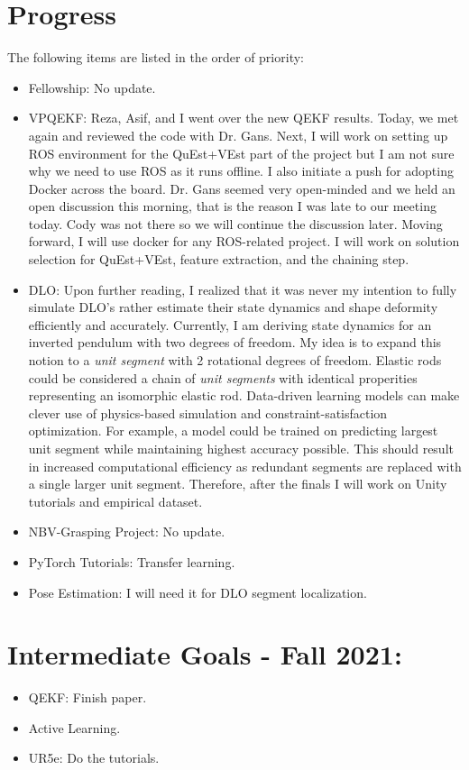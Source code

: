 \documentclass[11pt]{article}
\begin{document}
\section{Progress}
The following items are listed in the order of priority:
\begin{itemize}
      \item Fellowship: No update.
      \item VPQEKF: Reza, Asif, and I went over the new QEKF results. Today, we met
      again and reviewed the code with Dr. Gans. Next, I will work on setting
      up ROS environment
      for the QuEst+VEst \cite{QuEst} part of the project but I am not sure why we need to
      use ROS as it runs offline. I also initiate a push for adopting Docker
      across the board. Dr.
      Gans seemed very open-minded and we held an open discussion this morning,
      that is the reason I was late to our meeting today. Cody was not there so
      we will continue the discussion later. Moving forward, I will use docker
      for any ROS-related project. I will work on solution selection for QuEst+VEst,
      feature extraction, and the chaining step.
      \item DLO: Upon further reading, I realized that it was never my intention
      to fully simulate DLO's rather estimate their state dynamics and shape deformity efficiently and accurately. Currently, I am deriving state dynamics for an
      inverted pendulum with two degrees of freedom. My idea is to expand this
      notion to a \emph{unit segment} with 2 rotational degrees of freedom. Elastic
      rods could be considered a chain of \emph{unit segments} with identical
      properities representing an isomorphic elastic rod. Data-driven learning
      models can make clever use of physics-based simulation and constraint-satisfaction
      optimization. For example, a model could be trained on predicting largest
      unit segment while maintaining highest accuracy possible. This should result
      in increased computational efficiency as redundant segments are replaced with
      a single larger unit segment. Therefore, after the finals I will work on
      Unity tutorials and empirical dataset.
      \item NBV-Grasping Project: No update.
      \item PyTorch Tutorials: Transfer learning.
      \item Pose Estimation: I will need it for DLO segment localization.
\end{itemize}


\section{Intermediate Goals - Fall 2021:}
\begin{itemize}
      \item QEKF: Finish paper.
      \item Active Learning.
      \item UR5e: Do the tutorials.
\end{itemize}


\newpage


\end{document}
